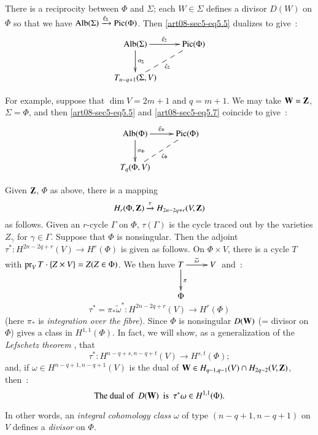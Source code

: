 \begin{remark*}
There is a reciprocity between $\Phi$ and $\Sigma$; each $W\in \Sigma$ defines a divisor $D(W)$ on $\Phi$ so that we have $\operatorname{\mathrm{Alb}}(\Sigma)\xrightarrow{\xi_{\Sigma}}\operatorname{\mathrm{Pic}}(\Phi)$. Then \eqref{art08-sec5-eq5.5} dualizes to give~:
\begin{equation}
\vcenter{\xymatrix{
\Alb(\Sigma)\ar[r]^-{\xi_{\Sigma}}\ar[d]^{\alpha_{\Sigma}} & \Pic(\Phi)\\
T_{n-q+1}(\Sigma,V)\ar@{--}[ur]_{\zeta_{\Sigma}} &
}}\label{art08-sec5-eq5.7}
\end{equation}

For example, suppose that $\dim V=2m+1$ and $q=m+1$. We may take $\mathbf{W}=\mathbf{Z}$, $\Sigma=\Phi$, and then \eqref{art08-sec5-eq5.5} and \eqref{art08-sec5-eq5.7} coincide to give~:
\begin{equation}
\vcenter{\xymatrix{
\Alb(\Phi)\ar[r]^-{\xi_{\Phi}}\ar[d]^-{\alpha_{\Phi}} & \Pic(\Phi)\\
T_{q}(\Phi,V)\ar@{--}[ur]_-{\zeta_{\Phi}} & 
}}\label{art08-sec5-eq5.8}
\end{equation}

Given $\mathbf{Z}$, $\Phi$ as above, there is a mapping
\begin{equation}
H_{r}(\Phi,\mathbf{Z})\xrightarrow{\tau}H_{2n-2q+r}(V,\mathbf{Z})\label{art08-sec5-eq5.9}
\end{equation}
as follows. Given an $r$-cycle $\Gamma$ on $\Phi$, $\tau(\Gamma)$ is the cycle traced out by the varieties $Z_{\gamma}$ for $\gamma\in \Gamma$. Suppose that $\Phi$ is nonsingular. Then the adjoint $\tau^{*}:H^{2n-2q+r}(V)\to H^{r}(\Phi)$ is given as follows. On $\Phi\times V$, there is a cycle $T$ with $\operatorname{\mathrm{pr}}_{V}T\cdot\{Z\times V\}=Z(Z\in \Phi)$. We then have\pageoriginale $\xymatrix{T\ar[d]^{\pi}\ar[r]^-{\widetilde{\omega}} & V\\ \Phi &}$ and~:
\begin{equation}
\tau^{*}=\pi_{*}\widetilde{\omega}^{*}:H^{2n-2q+r}(V)\to H^{r}(\Phi)\label{art08-sec5-eq5.10}
\end{equation}
(here $\pi_{*}$ is {\em integration over the fibre}). Since $\Phi$ is nonsingular $D(\mathbf{W})$ (= divisor on $\Phi$) gives a class in $H^{1,1}(\Phi)$. In fact, we will show, as a generalization of the {\em Lefschetz theorem} \cite{art08-key19}, that
\begin{equation}
\tau^{*}:H^{n-q+s,n-q+t}(V)\to H^{s,t}(\Phi);\label{art08-sec5-eq5.11}
\end{equation}
and, if $\omega\in H^{n-q+1,n-q+1}(V)$ is the dual of $\bfW\in H_{q-1,q-1}(V)\cap H_{2q-2}\break (V,\bfZ)$, then~:
\begin{equation}
\text{The dual of~ } D(\mathbf{W})\text{~ is ~} \tau^{*}\omega\in H^{1,1}(\Phi).\label{art08-sec5-eq5.12}
\end{equation}

In other words, an {\em integral cohomology class} $\omega$ of type $(n-q+1, n-q+1)$ on $V$ defines a {\em divisor} on $\Phi$.
\end{remark*}


